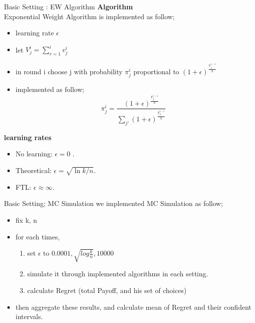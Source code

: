 \documentclass{beamer}
\begin{document}
\begin{frame}{Basic Setting : EW Algorithm}
    \textbf{Algorithm}\\
    Exponential Weight Algorithm is implemented as follow; 
    \begin{itemize}
        \item learning rate $\epsilon$
        \item let $V_j^i = \sum_{r = 1}^i v_j^i$
        \item in round i choose j with probability $\pi_j^i$ proportional to $(1+\epsilon)^{\frac{V_j^{i-1}}{h}}$
        \item implemented as follow;
        {\small
        \[
            \pi_j^i = \frac{(1+\epsilon)^{\frac{V_j^{i-1}}{h}}}{\sum_{j'}(1+\epsilon)^{\frac{V_{j'}^{i-1}}{h}}}
        \]}
    \end{itemize}
    \textbf{learning rates}\\
    \begin{itemize}
      \item No learning: \(\epsilon = 0\) .
      \item Theoretical: \(\epsilon = \sqrt{\ln k / n}\).
      \item FTL:  \(\epsilon \approx \infty\).
    \end{itemize}
\end{frame}

\begin{frame}{Basic Setting; MC Simulation}
    we implemented MC Simulation as follow;
    \begin{itemize}
        \item fix k, n
        \item for each times, 
        \begin{enumerate}
            \item set $\epsilon$ to {$0.0001, \sqrt{log\frac{k}{n}}, 10000$}
            \item simulate it through implemented algorithms in each setting.
            \item calculate Regret (total Payoff, and his set of choices)
        \end{enumerate}
        \item then aggregate these results, and calculate mean of Regret and their confident intervals.
    \end{itemize}
\end{frame}
\end{document}
